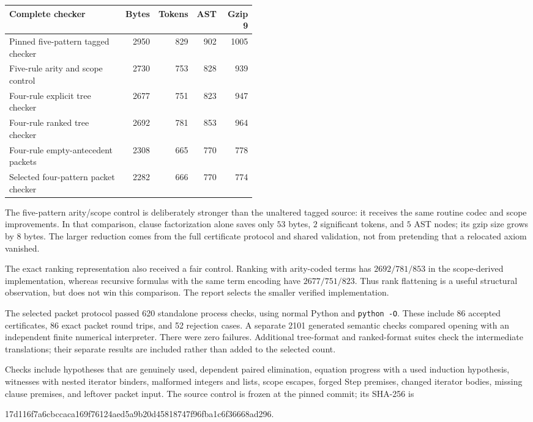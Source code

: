 \documentclass[11pt]{article}
\theoremstyle{definition}
\begin{document}
\begin{center}
\small
\begin{tabular}{@{}p{0.47\linewidth}rrrr@{}}
\toprule
Complete checker & Bytes & Tokens & AST & Gzip 9\\
\midrule
Pinned five-pattern tagged checker & 2950 & 829 & 902 & 1005 \\
Five-rule arity and scope control & 2730 & 753 & 828 & 939 \\
Four-rule explicit tree checker & 2677 & 751 & 823 & 947 \\
Four-rule ranked tree checker & 2692 & 781 & 853 & 964 \\
Four-rule empty-antecedent packets & 2308 & 665 & 770 & 778 \\
Selected four-pattern packet checker & 2282 & 666 & 770 & 774 \\
\bottomrule
\end{tabular}
\end{center}

The five-pattern arity/scope control is deliberately stronger than the
unaltered tagged source: it receives the same routine codec and scope
improvements. In that comparison, clause factorization alone saves only
$53$ bytes, $2$ significant tokens, and $5$ AST nodes; its gzip size grows
by $8$ bytes. The larger reduction comes from the full certificate protocol
and shared validation, not from pretending that a relocated axiom vanished.

The exact ranking representation also received a fair control. Ranking
with arity-coded terms has $2692/781/853$ in the scope-derived implementation,
whereas recursive formulas with the same term encoding have $2677/751/823$.
Thus rank flattening is a useful structural observation, but does not win
this comparison. The report selects the smaller verified implementation.

The selected packet protocol passed 620 standalone process checks, using normal Python and \texttt{python -O}. These include 86 accepted certificates, 86 exact packet round trips, and 52 rejection cases. A separate 2101 generated semantic checks compared opening with an independent finite numerical interpreter. There were zero failures. Additional tree-format and ranked-format suites check the intermediate translations; their separate results are included rather than added to the selected count.

Checks include hypotheses that are genuinely used, dependent paired
elimination, equation progress with a used induction hypothesis, witnesses
with nested iterator binders, malformed integers and lists, scope escapes,
forged Step premises, changed iterator bodies, missing clause premises,
and leftover packet input. The source control is frozen at the pinned
commit; its SHA-256 is
\begin{center}\ttfamily\scriptsize
17d116f7a6cbccaca169f76124aed5a9b20d45818747f96fba1c6f36668ad296.
\end{center}
\end{document}
